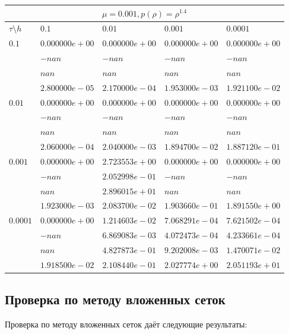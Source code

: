 \documentclass[12pt,a4paper]{article}
\begin{document}
\begin{tabular}{ |l|l|l|l|l| }
    \hline
    \multicolumn{5}{|c|}{$\mu = 0.001, p(\rho)  = \rho^{1.4}$} \\
    \hline
    $\tau\setminus h$ & $0.1$ & $0.01$ & $0.001$ & $0.0001$\\
    \hline
    $0.1$ & $0.000000e+00$ & $0.000000e+00$ & $0.000000e+00$ & $0.000000e+00$ \\
    & $-nan$ & $-nan$ & $-nan$ & $-nan$ \\
    & $nan$ & $nan$ & $nan$ & $nan$ \\
    & $2.800000e-05$ & $2.170000e-04$ & $1.953000e-03$ & $1.921100e-02$ \\
    \hline
    $0.01$ & $0.000000e+00$ & $0.000000e+00$ & $0.000000e+00$ & $0.000000e+00$ \\
    & $-nan$ & $-nan$ & $-nan$ & $-nan$ \\
    & $nan$ & $nan$ & $nan$ & $nan$ \\
    & $2.060000e-04$ & $2.040000e-03$ & $1.894700e-02$ & $1.887120e-01$ \\
    \hline
    $0.001$ & $0.000000e+00$ & $2.723553e+00$ & $0.000000e+00$ & $0.000000e+00$ \\
    & $-nan$ & $2.052998e-01$ & $-nan$ & $-nan$ \\
    & $nan$ & $2.896015e+01$ & $nan$ & $nan$ \\
    & $1.923000e-03$ & $2.083700e-02$ & $1.903660e-01$ & $1.891550e+00$ \\
    \hline
    $0.0001$ & $0.000000e+00$ & $1.214603e-02$ & $7.068291e-04$ & $7.621502e-04$ \\
    & $-nan$ & $6.869083e-03$ & $4.072473e-04$ & $4.233661e-04$ \\
    & $nan$ & $4.827873e-01$ & $9.202008e-03$ & $1.470071e-02$ \\
    & $1.918500e-02$ & $2.108440e-01$ & $2.027774e+00$ & $2.051193e+01$ \\
    \hline
\end{tabular}

\subsection{Проверка по методу вложенных сеток}
Проверка по методу вложенных сеток даёт следующие результаты:
\end{document}
